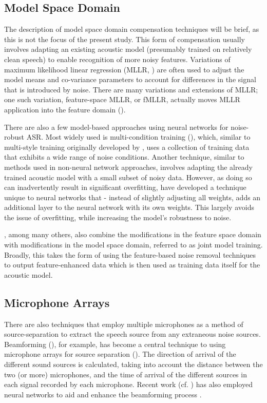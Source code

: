 \documentclass[dissertation,copyright]{uathesis}
\begin{document}
\subsection{Model Space Domain}

The description of model space domain compensation techniques will be brief, as this is not the focus of the present study.  This form of compensation usually involves adapting an existing acoustic model (presumably trained on relatively clean speech) to enable recognition of more noisy features.  Variations of maximum likelihood linear regression (MLLR, \cite{leggetter:95}) are often used to adjust the %
model means and co-variance parameters to account for differences in the signal that is introduced by noise.  There are many variations and extensions of MLLR; one such variation, feature-space MLLR, or fMLLR, actually moves MLLR application into the feature domain (\cite{gales:98}).  

There are also a few model-based approaches using neural networks for noise-robust ASR.  Most widely used is multi-condition training (\cite{seltzer:13,zhang:17}), which, similar to multi-style training originally developed by \cite{lippman:87}, uses a collection of training data that exhibits a wide range of noise conditions.  Another technique, similar to methods used in non-neural network approaches, involves adapting the already trained acoustic model with a small subset of noisy data.  However, as doing so can inadvertently result in significant overfitting, \cite{mirsamadi:15} have developed a technique unique to neural networks that - instead of slightly adjusting all weights, adds an additional layer to the neural network with its own weights.  This largely avoids the issue of overfitting, while increasing the model's robustness to noise.

\cite{weninger:13}, among many others, also combine the modifications in the feature space domain with modifications in the model space domain, referred to as joint model training.  Broadly, this takes the form of using the feature-based noise removal techniques to output feature-enhanced data which is then used as training data itself for the acoustic model.

\subsection{Microphone Arrays}

There are also techniques that employ multiple microphones as a method of source-separation to extract the speech source from any extraneous noise sources. Beamforming (\cite{veen:88}), for example, has become a central technique to using microphone arrays for source separation (\cite{hori:15,zhang:17}).
The direction of arrival of the different sound sources is calculated, taking into account the distance between the two (or more) microphones, and the time of arrival of the different sources in each signal recorded by each microphone.  Recent work (cf. \cite{heymann:15,sivasankaran:15,heymann:16}) has also employed neural networks to aid and enhance the beamforming process . 
\end{document}
